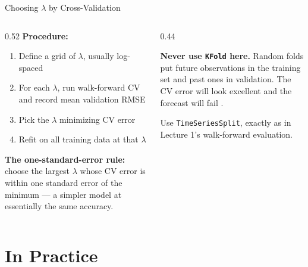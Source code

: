 \documentclass[aspectratio=169, 11pt]{beamer}
\begin{document}
\begin{frame}{Choosing $\lambda$ by Cross-Validation}
  \begin{columns}[T]
    \begin{column}{0.52\textwidth}
      \textbf{Procedure:}
      \begin{enumerate}\small\itemsep0pt
        \item Define a grid of $\lambda$, usually log-spaced
        \item For each $\lambda$, run walk-forward CV and record mean
              validation RMSE
        \item Pick the $\lambda$ minimizing CV error
        \item Refit on all training data at that $\lambda$
      \end{enumerate}
      \vspace{0.1cm}
      \textbf{The one-standard-error rule:} choose the largest $\lambda$
      whose CV error is within one standard error of the minimum ---
      a simpler model at essentially the same accuracy.
    \end{column}
    \begin{column}{0.44\textwidth}
      \begin{warningbox}
        \small \textbf{Never use \texttt{KFold} here.} Random folds put future
        observations in the training set and past ones in validation. The CV
        error will look excellent and the forecast will fail
        \parencite{Bergmeir2018}.
      \end{warningbox}
      \vspace{0.1cm}
      \begin{keybox}
        \small Use \texttt{TimeSeriesSplit}, exactly as in Lecture 1's
        walk-forward evaluation.
      \end{keybox}
    \end{column}
  \end{columns}
\end{frame}

\section{In Practice}

\end{document}
